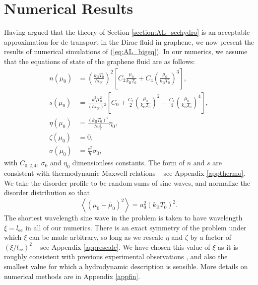 \section{Numerical Results}\label{section:AL_secnum}
Having argued that the theory of Section \ref{section:AL_sechydro} is an acceptable approximation for dc transport in the Dirac fluid in graphene, we now present the results of numerical simulations of (\ref{eq:AL_bigeq}).   In our numerics, we assume that the equations of state of the graphene fluid are as follows: \begin{subequations}\label{eq:AL_numericmain}\begin{align}
n(\mu_0) &= \left(\frac{k_{\mathrm{B}}T_0}{\hbar v_{\mathrm{F}}}\right)^2\left[C_2 \frac{\mu_0}{k_{\mathrm{B}}T_0} + C_4 \left(\frac{\mu_0}{k_{\mathrm{B}}T_0}\right)^3\right], \\
s(\mu_0) &= \frac{k_{\mathrm{B}}^3T_0^2}{(\hbar v_{\mathrm{F}})^2}\left[C_0 + \frac{C_2}{2} \left(\frac{\mu_0}{k_{\mathrm{B}}T_0}\right)^2 -\frac{C_4}{4} \left(\frac{\mu_0}{k_{\mathrm{B}}T_0}\right)^4\right], \\
\eta(\mu_0) &= \frac{(k_{\mathrm{B}}T_0)^2}{\hbar v_{\mathrm{F}}^2} \eta_0, \\
\zeta(\mu_0) &= 0, \\
\sigma(\mu_0) &= \frac{e^2}{\hbar}\sigma_0,
\end{align}\end{subequations}
with $C_{0,2,4}$, $\sigma_0$ and $\eta_0$ dimensionless constants.   The form of $n$ and $s$ are consistent with thermodynamic Maxwell relations -- see Appendix \ref{appthermo}.   We take the disorder profile to be random sums of sine waves, and normalize the disorder distribution so that \begin{equation}
\left\langle (\mu_0 - \bar\mu_0)^2\right\rangle = u_0^2 (k_{\mathrm{B}}T_0)^2.  \label{eq:AL_numericmain2}
\end{equation}
The shortest wavelength sine wave in the problem is taken to have wavelength $\xi=l_{\mathrm{ee}}$ in all of our numerics.   There is an exact symmetry of the problem under which $\xi$ can be made arbitrary, so long as we rescale $\eta$ and $\zeta$ by a factor of $(\xi/l_{\mathrm{ee}})^2$ -- see Appendix \ref{apprescale}.   We have chosen this value of $\xi$ as it is roughly consistent with previous experimental observations \cite{xue_scanning_2011}, and also the smallest value for which a hydrodynamic description is sensible.    More details on numerical methods are in Appendix \ref{appfin}.




